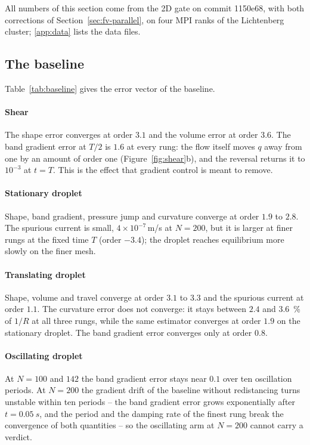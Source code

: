 \documentclass[preprint,3p,11pt]{elsarticle}
\begin{document}
All numbers of this section come from the 2D gate on commit 1150e68, with both
corrections of Section~\ref{sec:fv-parallel}, on four MPI ranks of the Lichtenberg
cluster; \ref{app:data} lists the data files.

\subsection{The baseline}
\label{sec:res-baseline}
Table~\ref{tab:baseline} gives the error vector of the baseline.

\paragraph{Shear} The shape error converges at order $3.1$ and the volume error at
order $3.6$. The band gradient error at $T/2$ is $1.6$ at every rung: the flow itself
moves $q$ away from one by an amount of order one (Figure~\ref{fig:shear}b), and the
reversal returns it to $10^{-3}$ at $t=T$. This is the effect that gradient control is
meant to remove.

\paragraph{Stationary droplet} Shape, band gradient, pressure jump and curvature
converge at order $1.9$ to $2.8$. The spurious current is small,
$4\times10^{-7}$\,m/s at $N=200$, but it is larger at finer rungs at the fixed time $T$
(order $-3.4$); the droplet reaches equilibrium more slowly on the finer mesh.

\paragraph{Translating droplet} Shape, volume and travel converge at order $3.1$ to
$3.3$ and the spurious current at order $1.1$. The curvature error does not converge:
it stays between $2.4$ and \SI{3.6}{\percent} of $1/R$ at all three rungs, while the
same estimator converges at order $1.9$ on the stationary droplet. The band gradient
error converges only at order $0.8$.

\paragraph{Oscillating droplet} At $N=100$ and $142$ the band gradient error stays near
$0.1$ over ten oscillation periods. At $N=200$ the gradient drift of the baseline without
redistancing turns unstable within ten periods -- the band gradient error grows
exponentially after $t=\SI{0.05}{s}$, and the period and the damping rate of the finest
rung break the convergence of both quantities \cite{maric2026sl} -- so the oscillating arm
at $N=200$ cannot carry a verdict.
\end{document}
